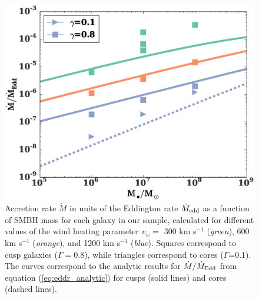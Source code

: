 \documentclass[usenatbib,fleqn]{mn2e}
\newcommand{\eddr}{\dot{M}/\dot{M}_{\rm Edd}}
\newcommand{\vwO}{v_{w}}
\begin{document}
\begin{figure}
  \includegraphics[width=\columnwidth]{mdot_mass.eps}
  \caption{\label{fig:mdot_mass} Accretion rate $\dot{M}$ in units of
    the Eddington rate $\dot{M}_{\rm edd}$ as a function of SMBH mass
    for each galaxy in our sample, calculated for different values of
    the wind heating parameter $\vwO =$ 300 km s$^{-1}$ ({\it green}),
    600 km s$^{-1}$ ({\it orange}), and 1200 km s$^{-1}$ ({\it blue}).
    Squares correspond to cusp galaxies ($\Gamma=0.8$), while
    triangles correspond to cores ($\Gamma$=0.1). The curves correspond
    to the analytic results for $\eddr$ from equation
    (\ref{eq:eddr_analytic}) for cusps (solid lines) and cores (dashed
    lines).  }
\end{figure}

\end{document}
